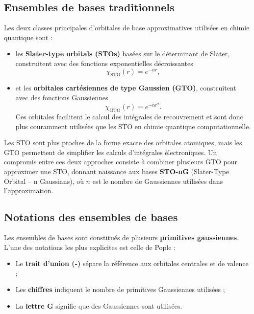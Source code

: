 \documentclass[12pt,a4paper]{article} %
\numberwithin{equation}{section} %
\numberwithin{figure}{section} %
\numberwithin{table}{section} %
\begin{document}
\subsection{Ensembles de bases traditionnels}

Les deux classes principales d'orbitales de base approximatives utilisées en chimie quantique sont :
\begin{itemize}
\item les \textbf{Slater-type orbitals (STOs)} basées sur le déterminant de Slater, construitent avec des fonctions exponentielles décroissantes
    \begin{equation}
        \chi_{\mathrm{STO}}(r) = e^{-\alpha r},
    \end{equation}
\item et les \textbf{orbitales cartésiennes de type Gaussien (GTO)}, construitent avec des fonctions Gaussiennes
    \begin{equation}
        \chi_{\mathrm{GTO}}(r) = e^{-\alpha r^2}.
    \end{equation}
  Ces orbitales facilitent le calcul des intégrales de recouvrement et sont donc plus couramment utilisées que les STO en chimie quantique computationnelle.
\end{itemize}

Les STO sont plus proches de la forme exacte des orbitales atomiques, mais les GTO permettent de simplifier les calculs d’intégrales électroniques. Un compromis entre ces deux approches consiste à combiner plusieurs GTO pour approximer une STO, donnant naissance aux bases \textbf{STO-nG} (Slater-Type Orbital – n Gaussians), où $n$ est le nombre de Gaussiennes utilisées dans l’approximation.

\subsection{Notations des ensembles de bases}

Les ensembles de bases sont constitués de plusieurs \textbf{primitives gaussiennes}. L'une des notations les plus explicites est celle de Pople :
\begin{itemize}
    \item Le \textbf{trait d'union (-)} sépare la référence aux orbitales centrales et de valence ;
    \item Les \textbf{chiffres} indiquent le nombre de primitives Gaussiennes utilisées ;
    \item La \textbf{lettre G} signifie que des Gaussiennes sont utilisées.
\end{itemize}
\end{document}
